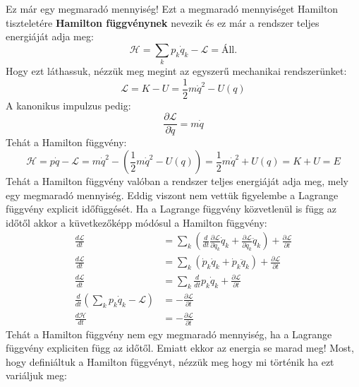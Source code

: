 \documentclass[../main.tex]{subfiles}
\begin{document}
Ez már egy megmaradó mennyiség! Ezt a megmaradó mennyiséget Hamilton tiszteletére \textbf{Hamilton függvénynek} nevezik és ez már a rendszer teljes energiáját adja meg:
\begin{equation}
    \boxed{\mathcal{H} = \sum_k p_k \dot{q}_k - \mathcal{L} = \text{Áll.}}
\end{equation}
Hogy ezt láthassuk, nézzük meg megint az egyszerű mechanikai rendszerünket:
\begin{equation}
    \mathcal{L} = K - U = \frac{1}{2} m \dot{q}^2 - U(q)
\end{equation}
A kanonikus impulzus pedig:
\begin{equation}
    \frac{\partial \mathcal{L}}{\partial \dot{q}} = m \dot{q}
\end{equation}
Tehát a Hamilton függvény:
\begin{equation}
    \mathcal{H} = p \dot{q} - \mathcal{L} = m \dot{q}^2 - \left( \frac{1}{2} m \dot{q}^2 - U(q) \right) = \frac{1}{2} m \dot{q}^2 + U(q) = K + U = E
\end{equation}
Tehát a Hamilton függvény valóban a rendszer teljes energiáját adja meg, mely egy megmaradó mennyiség. Eddig viszont nem vettük figyelembe a Lagrange függvény explicit időfüggését. Ha a Lagrange függvény közvetlenül is függ az időtől akkor a küvetkezőképp módósul a Hamilton függvény:
\begin{equation}
    \begin{aligned}
        \frac{d \mathcal{L}}{dt} &= \sum_k \left(\frac{d}{dt} \frac{\partial \mathcal{L}}{\partial \dot{q}_k} \dot{q}_k + \frac{\partial \mathcal{L}}{\partial \dot{q}_k} \ddot{q}_k \right) + \frac{\partial \mathcal{L}}{\partial t} \\
        \frac{d \mathcal{L}}{dt} &= \sum_k \left( \dot{p}_k \dot{q}_k + \dot{p}_k \ddot{q}_k \right) + \frac{\partial \mathcal{L}}{\partial t} \\
        \frac{d \mathcal{L}}{dt} &= \sum_k \frac{d}{dt} p_k\dot{q}_k + \frac{\partial \mathcal{L}}{\partial t} \\
        \frac{d}{dt} \left( \sum_k p_k \dot{q}_k - \mathcal{L}\right) &= -\frac{\partial \mathcal{L}}{\partial t} \\
        \frac{d \mathcal{H}}{dt} &= -\frac{\partial \mathcal{L}}{\partial t}
    \end{aligned}
\end{equation}
Tehát a Hamilton függvény nem egy megmaradó mennyiség, ha a Lagrange függvény expliciten függ az időtől. Emiatt ekkor az energia se marad meg! Most, hogy definiáltuk a Hamilton függvényt, nézzük meg hogy mi történik ha ezt variáljuk meg:
\end{document}
